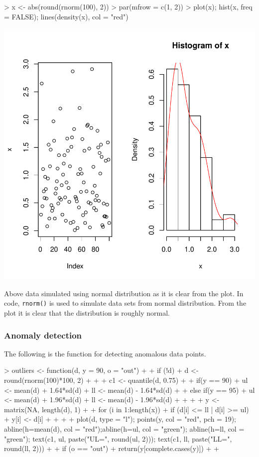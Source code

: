 \documentclass{article}
\begin{document}
\begin{Schunk}
\begin{Sinput}
> x <- abs(round(rnorm(100), 2))
> par(mfrow = c(1, 2))
> plot(x); hist(x, freq = FALSE); lines(density(x), col = "red")
\end{Sinput}
\end{Schunk}
\includegraphics{outliers-001}

Above data simulated using normal distribution as it is clear from the plot. In code, \texttt{rnorm()} is used to simulate data sets from normal distribution. From the plot it is clear that the distribution is roughly normal. 

\subsubsection{Anomaly detection}

The following is the function for detecting anomalous data points. 

\begin{Schunk}
\begin{Sinput}
> outliers <- function(d, y = 90, o = "out"){
+   
+   if (!d){
+     d <- round(rnorm(100)*100, 2)
+   }
+   
+   c1 <- quantile(d, 0.75)
+   
+   if(y == 90){
+     ul <- mean(d) + 1.64*sd(d)
+     ll <- mean(d) - 1.64*sd(d)
+   
+   } else if(y == 95){
+     ul <- mean(d) + 1.96*sd(d)
+     ll <- mean(d) - 1.96*sd(d)
+   
+   }
+   
+   y <- matrix(NA, length(d), 1)
+   
+   for (i in 1:length(x)){
+     if (d[i] <= ll | d[i] >= ul){
+       y[i] <- d[i]
+     }
+   }
+   
+   plot(d, type = "l"); points(y, col = "red", pch = 19); abline(h=mean(d), col = "red");abline(h=ul, col = "green"); abline(h=ll, col = "green"); text(c1, ul, paste("UL=", round(ul, 2))); text(c1, ll, paste("LL=", round(ll, 2)))
+ 
+     if (o == "out"){
+     return(y[complete.cases(y)])
+   }
+ }
\end{Sinput}
\end{Schunk}
\end{document}
